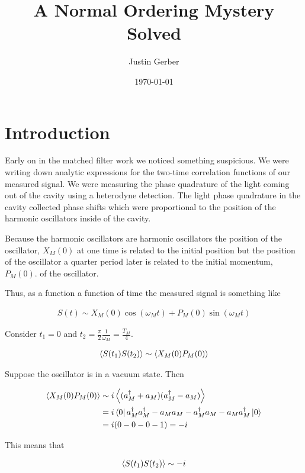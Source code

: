 \documentclass[12pt]{article}
\begin{document}
\title{A Normal Ordering Mystery Solved}
\author{Justin Gerber}
\date{\today}
\maketitle

\section{Introduction}

Early on in the matched filter work we noticed something suspicious. We were writing down analytic expressions for the two-time correlation functions of our measured signal. We were measuring the phase quadrature of the light coming out of the cavity using a heterodyne detection. The light phase quadrature in the cavity collected phase shifts which were proportional to the position of the harmonic oscillators inside of the cavity.

Because the harmonic oscillators are harmonic oscillators the position of the oscillator, $X_M(0)$ at one time is related to the initial position but the position of the oscillator a quarter period later is related to the initial momentum, $P_M(0)$. of the oscillator.

Thus, as a function a function of time the measured signal is something like

\begin{align}
S(t) \sim X_M(0)\cos(\omega_M t) + P_M(0)\sin(\omega_M t)
\end{align}

Consider $t_1 = 0$ and $t_2 = \frac{\pi}{2} \frac{1}{\omega_M} = \frac{T_M}{4}$.

\begin{align}
\Braket{S(t_1)S(t_2)} \sim \Braket{X_M(0)P_M(0)}
\end{align}

Suppose the oscillator is in a vacuum state. Then

\begin{align}
\Braket{X_M(0)P_M(0)} &\sim i\Braket{(a^{\dag}_M+a_M)(a^{\dag}_M-a_M)}\\
&= i \Bra{0}a_M^{\dag}a_M^{\dag} - a_M a_M - a_M^{\dag} a_M - a_M a_M^{\dag}\ket{0}\\
&= i(0 - 0 - 0 - 1) = -i
\end{align}

This means that

\begin{align}
\Braket{S(t_1)S(t_2)} \sim -i
\end{align}
\end{document}
